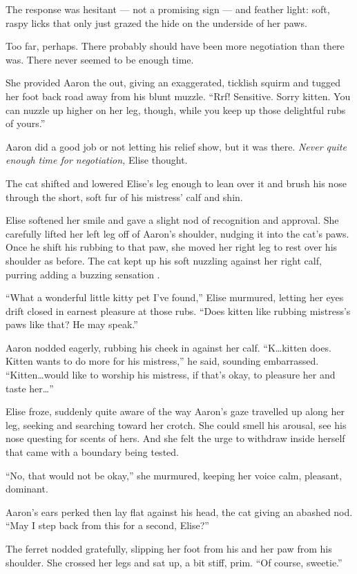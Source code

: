 The response was hesitant --- not a promising sign --- and feather
light: soft, raspy licks that only just grazed the hide on the underside
of her paws.

Too far, perhaps. There probably should have been more negotiation than
there was. There never seemed to be enough time.

She provided Aaron the out, giving an exaggerated, ticklish squirm and
tugged her foot back road away from his blunt muzzle. ``Rrf! Sensitive.
Sorry kitten. You can nuzzle up higher on her leg, though, while you
keep up those delightful rubs of yours.''

Aaron did a good job or not letting his relief show, but it was there.
\emph{Never quite enough time for negotiation,} Elise thought.

The cat shifted and lowered Elise's leg enough to lean over it and brush
his nose through the short, soft fur of his mistress' calf and shin.

Elise softened her smile and gave a slight nod of recognition and
approval. She carefully lifted her left leg off of Aaron's shoulder,
nudging it into the cat's paws. Once he shift his rubbing to that paw,
she moved her right leg to rest over his shoulder as before. The cat
kept up his soft nuzzling against her right calf, purring adding a
buzzing sensation .

``What a wonderful little kitty pet I've found,'' Elise murmured,
letting her eyes drift closed in earnest pleasure at those rubs. ``Does
kitten like rubbing mistress's paws like that? He may speak.''

Aaron nodded eagerly, rubbing his cheek in against her calf.
``K\ldots{}kitten does. Kitten wants to do more for his mistress,'' he
said, sounding embarrassed. ``Kitten\ldots{}would like to worship his
mistress, if that's okay, to pleasure her and taste her\ldots{}''

Elise froze, suddenly quite aware of the way Aaron's gaze travelled up
along her leg, seeking and searching toward her crotch. She could smell
his arousal, see his nose questing for scents of hers. And she felt the
urge to withdraw inside herself that came with a boundary being tested.

``No, that would not be okay,'' she murmured, keeping her voice calm,
pleasant, dominant.

Aaron's ears perked then lay flat against his head, the cat giving an
abashed nod. ``May I step back from this for a second, Elise?''

The ferret nodded gratefully, slipping her foot from his and her paw
from his shoulder. She crossed her legs and sat up, a bit stiff, prim.
``Of course, sweetie.''

